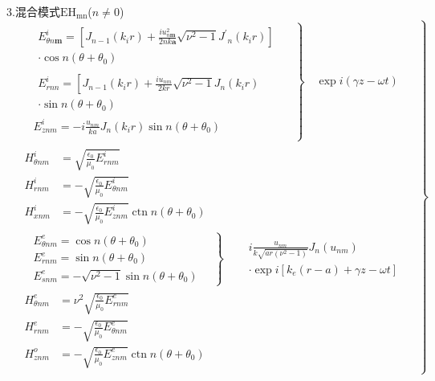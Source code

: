 \documentclass[14pt,a4paper,oneside]{article}
\numberwithin{equation}{subsection}             %
\numberwithin{figure}{subsection}               %
\begin{document}
3.混合模式$\mathrm{EH_{mn}}$($n\neq0$) 
\begin{equation}
    \left.\begin{aligned}
        &\left.\begin{aligned}
            &\begin{aligned}
                {E^i_{\theta n\boldsymbol{m}}}=\left[J_{n-1}\left(k_ir\right)+\frac{iu_{n\boldsymbol{m}}^2}{2nk\boldsymbol{a}}\sqrt{\nu^2-1}\left.J^{\prime}{}_n(k_ir)\right.\right]\\
                \cdot\cos n(\theta+\theta_0)\end{aligned}\\
            &\begin{aligned}
                {E^{i}_{rnn}}=\left[J_{n-1}\left(k_{i}r\right)+\frac{iu_{nm}}{2kr}\sqrt{\nu^{2}-1}\right.J_{n}(k_{i}r)\\
                \cdot\sin n(\theta+\theta_{0})\end{aligned}\\
            &{E^i_{znm}}=\left.-i\right.\frac{u_{nm}}{ka}J_n(k_ir)\mathrm{}\sin n(\theta+\theta_0)\\
        \end{aligned}\quad\right\}\quad \exp i(\gamma z-\omega t)\\
        &\begin{aligned}
            H_{\theta nm}^i&=\sqrt{\frac{\epsilon_0}{\mu_0}E_{rnm}^i}\\
            H_{rnm}^i&=-\sqrt{\frac{\epsilon_0}{\mu_0}E_{\theta nm}^i}\\
            H_{xnm}^i&=-\sqrt{\frac{\epsilon_0}{\mu_0}E_{znm}^i}\operatorname{ctn}n(\theta+\theta_0)
        \end{aligned}\\
        &\left.\begin{aligned}
            &E_{\theta nm}^{e}= \cos n(\theta+\theta_{0})\\
            &E_{rnm}^{e}= \sin n(\theta+\theta_{0})\\
            &E_{snm}^{e}= -\sqrt{\nu^{2}-1}\sin n(\theta+\theta_{0})
        \end{aligned}\quad\right\}\quad\begin{aligned}
                &i\frac{u_{nm}}{k\sqrt{ar(\nu^2-1)}}J_n(u_{nm})\\
                &\cdot\exp i[k_e(r-a)+\gamma z-\omega t]
            \end{aligned}\\
        &\begin{aligned}
            H_{\theta nm}^e&=\nu^2\sqrt{\frac{\epsilon_0}{\mu_0}E_{rnm}^e}\\
            H_{rnm}^e&=-\sqrt{\frac{\epsilon_0}{\mu_0}E_{\theta nm}^e}\\
            H_{znm}^o&=-\sqrt{\frac{\epsilon_0}{\mu_0}E_{znm}^e}\operatorname{ctn}n(\theta+\theta_0)
        \end{aligned}
    \end{aligned}\quad\right\}
    \label{eq:A.5}
\end{equation}
\end{document}
